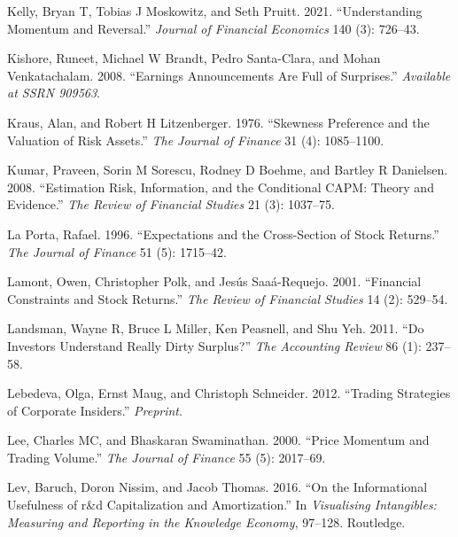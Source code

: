 \documentclass[
  letterpaper,
  DIV=11,
  numbers=noendperiod]{scrreprt}
\newlength{\cslhangindent}
\newlength{\cslentryspacingunit} %
\newenvironment{CSLReferences}[2] %
 {%
  \setlength{\parindent}{0pt}
  \ifodd #1
  \let\oldpar\par
  \def\par{\hangindent=\cslhangindent\oldpar}
  \fi
  \setlength{\parskip}{#2\cslentryspacingunit}
 }%
 {}
\begin{document}
\begin{CSLReferences}{1}{0}
\leavevmode{}%
Kelly, Bryan T, Tobias J Moskowitz, and Seth Pruitt. 2021.
{``Understanding Momentum and Reversal.''} \emph{Journal of Financial
Economics} 140 (3): 726--43.

\leavevmode{}%
Kishore, Runeet, Michael W Brandt, Pedro Santa-Clara, and Mohan
Venkatachalam. 2008. {``Earnings Announcements Are Full of Surprises.''}
\emph{Available at SSRN 909563}.

\leavevmode{}%
Kraus, Alan, and Robert H Litzenberger. 1976. {``Skewness Preference and
the Valuation of Risk Assets.''} \emph{The Journal of Finance} 31 (4):
1085--1100.

\leavevmode{}%
Kumar, Praveen, Sorin M Sorescu, Rodney D Boehme, and Bartley R
Danielsen. 2008. {``Estimation Risk, Information, and the Conditional
CAPM: Theory and Evidence.''} \emph{The Review of Financial Studies} 21
(3): 1037--75.

\leavevmode{}%
La Porta, Rafael. 1996. {``Expectations and the Cross-Section of Stock
Returns.''} \emph{The Journal of Finance} 51 (5): 1715--42.

\leavevmode{}%
Lamont, Owen, Christopher Polk, and Jesús Saaá-Requejo. 2001.
{``Financial Constraints and Stock Returns.''} \emph{The Review of
Financial Studies} 14 (2): 529--54.

\leavevmode{}%
Landsman, Wayne R, Bruce L Miller, Ken Peasnell, and Shu Yeh. 2011.
{``Do Investors Understand Really Dirty Surplus?''} \emph{The Accounting
Review} 86 (1): 237--58.

\leavevmode{}%
Lebedeva, Olga, Ernst Maug, and Christoph Schneider. 2012. {``Trading
Strategies of Corporate Insiders.''} \emph{Preprint}.

\leavevmode{}%
Lee, Charles MC, and Bhaskaran Swaminathan. 2000. {``Price Momentum and
Trading Volume.''} \emph{The Journal of Finance} 55 (5): 2017--69.

\leavevmode{}%
Lev, Baruch, Doron Nissim, and Jacob Thomas. 2016. {``On the
Informational Usefulness of r\&d Capitalization and Amortization.''} In
\emph{Visualising Intangibles: Measuring and Reporting in the Knowledge
Economy}, 97--128. Routledge.


\end{CSLReferences}
\end{document}
